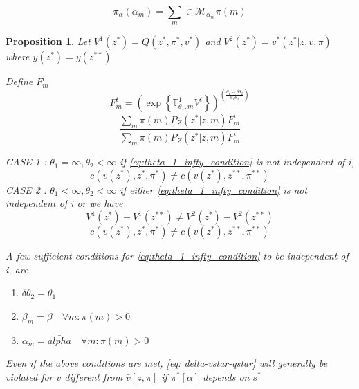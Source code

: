\documentclass[12pt]{article}
\newtheorem{definition}{Definition}
\newtheorem{proposition}{Proposition}
\begin{document}
\[\pi_\alpha (\alpha_m)=\sum_{m }\in \mathcal{M}_{\alpha_m} \pi(m)\]


\begin{proposition}
\label{propo-5}
Let $V^1(z^*)=Q(z^*,\pi^*,v^*)$ and $V^2(z^*)=v^*(z^*|z,v,\pi)$ where $y(z^*)=y(z^{**})$

Define $F_{m}^i$
\[F_{m}^i=\left(\exp\left \{
\mathbb{T}^1_{\theta_1,m}V^i
\right\}
\right)^{\left(\frac{\theta_1-\delta\theta_2}{\theta_1\theta_2}\right)}
\]
\begin{equation}
\label{eq:theta_1_infty_condition}
\frac{\sum_{m}\pi(m)P_Z(z^*|z,m)F^i_m
}
{\sum_{m}\pi(m)P_Z(z^*|z,m)F^i_m
}
\end{equation}


CASE 1 : $\theta_1=\infty,\theta_2 < \infty$
if \ref{eq:theta_1_infty_condition} is not independent of i,
\[c(v(z^*),z^*,\pi^*)\neq c(v(z^*),z^{**},\pi^{**})\]
CASE 2 : $\theta_1 <\infty ,\theta_2 < \infty$
if either \ref{eq:theta_1_infty_condition} is not independent of i or we have 
\begin{equation}
\label{eq: delta-vstar-qstar}
V^1(z^*)-V^1(z^{**}) \neq V^2(z^*)-V^2(z^{**}) 
\end{equation}
\[c(v(z^*),z^*,\pi^*)\neq c(v(z^*),z^{**},\pi^{**})\]

A few sufficient conditions for \ref{eq:theta_1_infty_condition} to be independent of i, are

\begin{enumerate}
\item $\delta \theta_2=\theta_1$
\item $\beta_m = \bar{\beta} \quad \forall m : \pi(m) >0$
\item $\alpha_m = \bar{alpha} \quad \forall m : \pi(m) >0$
\end{enumerate}
Even if the above conditions are met, \ref{eq: delta-vstar-qstar} will generally be violated for $v$ different from $\bar{v}[z,\pi]$ if $\pi^{*}[\alpha]$ depends on $s^*$
\end{proposition}
\end{document}
